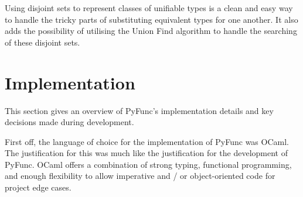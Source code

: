 \documentclass{l4proj}
\begin{document}
Using disjoint sets to represent classes of unifiable types is a clean and easy way to handle the tricky parts of substituting equivalent types for one another.
It also adds the possibility of utilising the Union Find algorithm to handle the searching of these disjoint sets.



\chapter{Implementation}
\label{chp:implementation}

This section gives an overview of PyFunc's implementation details and key decisions made during development.

First off, the language of choice for the implementation of PyFunc was OCaml.
The justification for this was much like the justification for the development of PyFunc.
OCaml offers a combination of strong typing, functional programming, and enough flexibility to allow imperative and / or object-oriented code for project edge cases.
 
\end{document}
